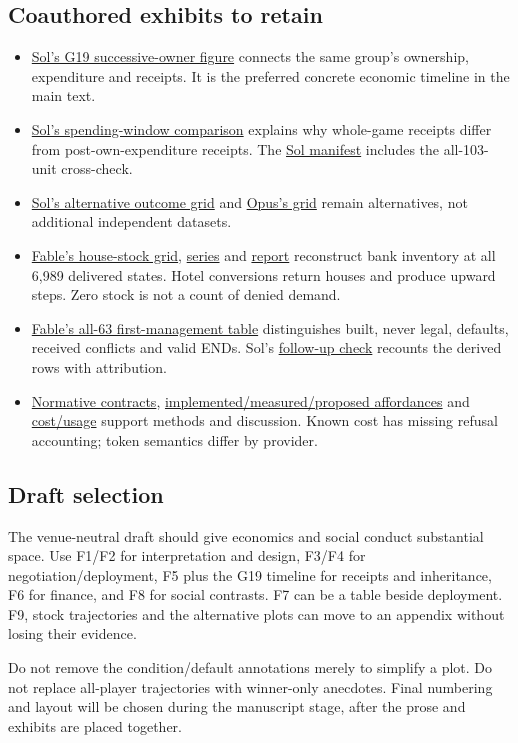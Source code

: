 \subsection*{Coauthored exhibits to retain}
\begin{itemize}
\item \href{run:../sol/exhibits/s3_g19_dark_blue.png}{Sol's G19 successive-owner figure} connects the same group's ownership, expenditure and receipts. It is the preferred concrete economic timeline in the main text.


\item \href{run:../sol/exhibits/s2_spending_windows.png}{Sol's spending-window comparison} explains why whole-game receipts differ from post-own-expenditure receipts. The \href{run:../sol/exhibits/manifest.json}{Sol manifest} includes the all-103-unit cross-check.


\item \href{run:../sol/exhibits/s1_seed_rotation.png}{Sol's alternative outcome grid} and \href{run:../opus/exhibits/outcome_grid.svg}{Opus's grid} remain alternatives, not additional independent datasets.


\item \href{run:../fable/exhibits/house_stock_grid.png}{Fable's house-stock grid}, \href{run:../fable/exhibits/house_stock_series.csv}{series} and \href{run:../fable/exhibits/house_stock_report.json}{report} reconstruct bank inventory at all 6,989 delivered states. Hotel conversions return houses and produce upward steps. Zero stock is not a count of denied demand.


\item \href{run:../fable/exhibits/first_management_causes.csv}{Fable's all-63 first-management table} distinguishes built, never legal, defaults, received conflicts and valid ENDs. Sol's \href{run:../sol/peer_followup_checks.json}{follow-up check} recounts the derived rows with attribution.


\item \href{run:../opus/exhibits/normative_contracts.md}{Normative contracts}, \href{run:../opus/exhibits/affordance_ledger.md}{implemented/measured/proposed affordances} and \href{run:../opus/exhibits/cost_usage.csv}{cost/usage} support methods and discussion. Known cost has missing refusal accounting; token semantics differ by provider.


\end{itemize}
\subsection*{Draft selection}
The venue-neutral draft should give economics and social conduct substantial space. Use F1/F2 for interpretation and design, F3/F4 for negotiation/deployment, F5 plus the G19 timeline for receipts and inheritance, F6 for finance, and F8 for social contrasts. F7 can be a table beside deployment. F9, stock trajectories and the alternative plots can move to an appendix without losing their evidence.

Do not remove the condition/default annotations merely to simplify a plot. Do not replace all-player trajectories with winner-only anecdotes. Final numbering and layout will be chosen during the manuscript stage, after the prose and exhibits are placed together.

